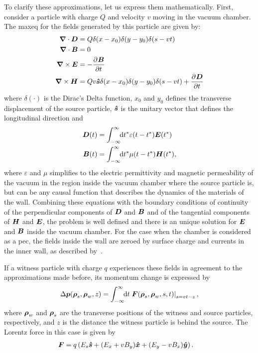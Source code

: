     To clarify these approximations, let us express them mathematically. First, consider a particle with charge $Q$ and velocity $v$  moving in the vacuum chamber. The \gls{maxeq} for the fields generated by this particle are given by:
    \begin{align}\label{eq:maxeq}
	  	\nonumber
      	\boldsymbol{\nabla}\cdot\boldsymbol{D} &= Q\delta(x-x_0)\delta(y-y_0)\delta(s-vt)\\ \nonumber
	  	\boldsymbol{\nabla}\cdot\boldsymbol{B} &= 0\\
	  	\boldsymbol{\nabla}\times\boldsymbol{E} &= -\frac{\partial^{{}}\boldsymbol{B}}{\partial t^{{}}}\\
	  	\nonumber
	  	\boldsymbol{\nabla}\times\boldsymbol{H} &= Qv\boldsymbol{\hat s}\delta(x-x_0)\delta(y-y_0)\delta(s-vt) + 		\frac{\partial^{{}}\boldsymbol{D}}{\partial t^{{}}}
    \end{align}
    where $\delta(\cdot)$ is the Dirac's Delta function, $x_0$ and $y_0$ defines the transverse displacement of the source particle, $\boldsymbol{\hat s}$ is the unitary vector that defines the longitudinal direction and
    \begin{align}
  	  	\boldsymbol{D}(t) &= \int_{-\infty}^{\infty}\!\!\text{d}t^* \varepsilon(t-t^*)\boldsymbol{E}(t^*)\\
	  	\boldsymbol{B}(t) &= \int_{-\infty}^{\infty}\!\!\text{d}t^* \mu(t-t^*)\boldsymbol{H}(t^*),
    \end{align}
    where $\varepsilon$ and $\mu$ simplifies to the electric permittivity and magnetic permeability of the vacuum in the region inside the vacuum chamber where the source particle is, but can be any causal function that describes the dynamics of the materials of the wall. Combining these equations with the boundary conditions of continuity of the perpendicular components of $\boldsymbol{D}$ and $\boldsymbol{B}$ and of the tangential components of $\boldsymbol{H}$ and $\boldsymbol{E}$, the problem is well defined and there is an unique solution for $\boldsymbol{E}$ and $\boldsymbol{B}$ inside the vacuum chamber. For the case when the chamber is considered as a \gls{pec}, the fields inside the wall are zeroed by surface charge and currents in the inner wall, as described by~.

    If a witness particle with charge $q$ experiences these fields in agreement to the approximations made before, its momentum change is expressed by
    \begin{align}\label{eq:momentum_gain}
  	  	\Delta \boldsymbol{p}(\boldsymbol{\rho}_s, \boldsymbol{\rho}_w, z) = \int_{-\infty}^{\infty}\!\!\text{d}t \left.\boldsymbol{F}(\boldsymbol{\rho}_s, \boldsymbol{\rho}_w, s, t)\right|_{s=vt-z},
    \end{align}
    where $\boldsymbol{\rho}_w$ and $\boldsymbol{\rho}_s$ are the transverse positions of the witness and source particles, respectively, and $z$ is the distance the witness particle is behind the source. The Lorentz force in this case is given by
    \begin{align}\label{eq:lorentz_force}
  	  	\boldsymbol{F} &= q\left(E_s\boldsymbol{\hat s} + (E_x+vB_y)\boldsymbol{\hat x} + (E_y-vB_x)\boldsymbol{\hat y}\right).
    \end{align}

